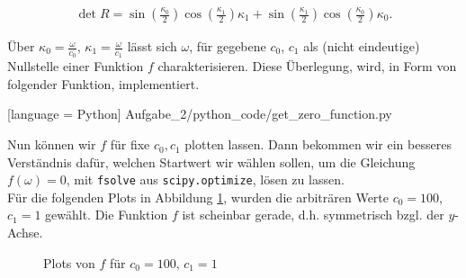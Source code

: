\begin{align*}
  \det{R} =
  \sin{\left(\frac{{\kappa}_{0}}{2} \right)} \cos{\left(\frac{{\kappa}_{1}}{2} \right)} {\kappa}_{1} + \sin{\left(\frac{{\kappa}_{1}}{2} \right)} \cos{\left(\frac{{\kappa}_{0}}{2} \right)} {\kappa}_{0}.
\end{align*}

Über $\kappa_0 = \frac{\omega}{c_0}$, $\kappa_1 = \frac{\omega}{c_1}$ lässt sich $\omega$, für gegebene $c_0$, $c_1$ als (nicht eindeutige) Nullstelle einer Funktion $f$ charakterisieren. Diese Überlegung, wird, in Form von folgender Funktion, implementiert.


[language = Python]
{Aufgabe_2/python_code/get_zero_function.py}

Nun können wir $f$ für fixe $c_0, c_1$ plotten lassen. Dann bekommen wir ein besseres Verständnis dafür, welchen Startwert wir wählen sollen, um die Gleichung $f(\omega) = 0$, mit \verb|fsolve| aus \verb|scipy.optimize|, lösen zu lassen. \\

Für die folgenden Plots in Abbildung \ref{fig:zero_function}, wurden die arbiträren Werte $c_0 = 100$, $c_1 = 1$ gewählt. Die Funktion $f$ ist scheinbar gerade, d.h. symmetrisch bzgl. der $y$-Achse.

\begin{figure}[h!]
  \centering
  \hspace{0mm}
  \caption{Plots von $f$ für $c_0 = 100$, $c_1 = 1$}
  \label{fig:zero_function}
\end{figure}

